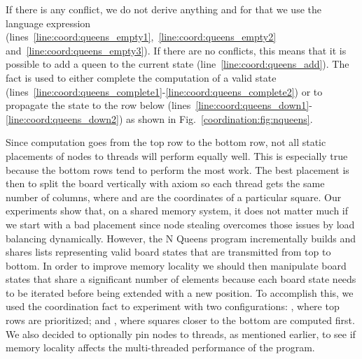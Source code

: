 If there is any conflict, we do not derive anything and for that we use the
language expression 
(lines~\ref{line:coord:queens_empty1},~\ref{line:coord:queens_empty2}
and~\ref{line:coord:queens_empty3}). If there are no conflicts, this means that
it is possible to add a queen to the current state
(line~\ref{line:coord:queens_add}). The fact  is used to
either complete the computation of a valid state
(lines~\ref{line:coord:queens_complete1}-\ref{line:coord:queens_complete2}) or
to propagate the state to the row below
(lines~\ref{line:coord:queens_down1}-\ref{line:coord:queens_down2}) as shown in
Fig.~\ref{coordination:fig:nqueens}.

Since computation goes from the top row to the bottom row, not all static
placements of nodes to threads will perform equally well. This is especially
true because the bottom rows tend to perform the most work.  The best placement
is then to split the board vertically with axiom  so each thread gets the same number of columns, where  and 
are the coordinates of a particular square. Our experiments show that, on a
shared memory system, it does not matter much if we start with a bad placement
since node stealing overcomes those issues by load balancing dynamically.
However, the N Queens program incrementally builds and shares lists representing
valid board states that are transmitted from top to bottom. In order to improve
memory locality we should then manipulate board states that share a significant
number of elements because each board state needs to be iterated before being
extended with a new position. To accomplish this, we used the coordination fact
 to experiment with two configurations:
, where top rows are prioritized; and , where squares
closer to the bottom are computed first. We also decided to optionally pin nodes
to threads, as mentioned earlier, to see if memory locality affects the
multi-threaded performance of the program.

